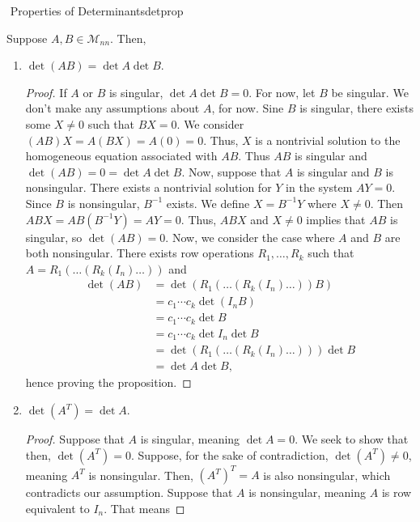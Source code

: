         \begin{theorem}{\Stop\,\,Properties of Determinants}{detprop}

            Suppose \(A,B\in\mathcal{M}_{nn}\). Then,
            \begin{enumerate}
                \item \(\det (AB) = \det A\det B\).
                \begin{proof}
                    If \(A\) or \(B\) is singular, \(\det A\det B=0\). For now, let \(B\) be singular. We don't make any assumptions about \(A\), for now. Sine \(B\) is singular, there exists some \(X\neq0\) such that \(BX=0\). We consider \((AB)X=A(BX)=A(0)=0\). Thus, \(X\) is a nontrivial solution to the homogeneous equation associated with \(AB\). Thus \(AB\) is singular and \(\det (AB) = 0 = \det A\det B\). Now, suppose that \(A\) is singular and \(B\) is nonsingular. There exists a nontrivial solution for \(Y\) in the system \(AY=0\). Since \(B\) is nonsingular, \(B^{-1}\) exists. We define \(X=B^{-1}Y\) where \(X\neq0\). Then \(ABX=AB(B^{-1}Y)=AY=0\). Thus, \(ABX\) and \(X\neq 0\) implies that \(AB\) is singular, so \(\det (AB)=0\). Now, we consider the case where \(A\) and \(B\) are both nonsingular. There exists row operations \(R_1,\ldots,R_k\) such that \(A=R_1(\ldots(R_k(I_n)\ldots))\) and 
                    \begin{align*}
                        \det (AB)&=\det(R_1(\ldots(R_k(I_n)\ldots))B) \\
                        &=c_1\cdots c_k\det (I_nB) \\
                        &=c_1\cdots c_k\det B \\
                        &=c_1\cdots c_k \det I_n\det B \\
                        &=\det(R_1(\ldots(R_k(I_n)\ldots)))\det B \\
                        &=\det A\det B,
                    \end{align*}
                    hence proving the proposition.
                \end{proof}
                \item \(\det (A^T) = \det A\).
                \begin{proof}
                    Suppose that \(A\) is singular, meaning \(\det A=0\). We seek to show that then, \(\det (A^T)=0\). Suppose, for the sake of contradiction, \(\det (A^T)\neq0\), meaning \(A^T\) is nonsingular. Then, \((A^T)^T=A\) is also nonsingular, which contradicts our assumption. Suppose that \(A\) is nonsingular, meaning \(A\) is row equivalent to \(I_n\). That means

\end{proof}
\end{enumerate}
\end{theorem}
